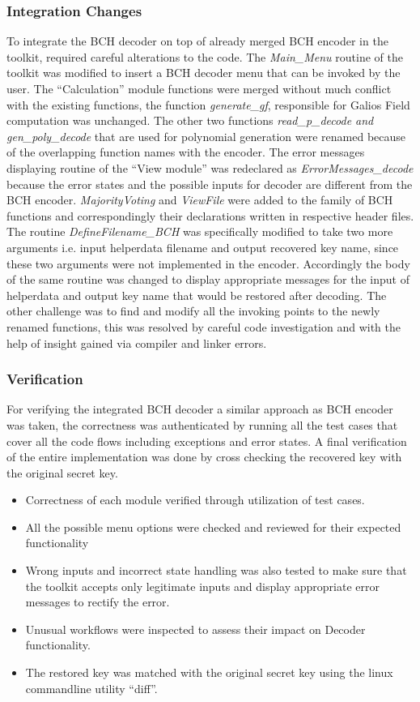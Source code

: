 \subsubsection{Integration Changes}
To integrate the BCH decoder on top of already merged BCH encoder in the toolkit, required careful alterations to the code. The \emph{Main\_Menu} routine of the toolkit was modified to insert a BCH decoder menu that can be invoked by the user. The ``Calculation'' module functions were merged without much conflict with the existing functions, the function \emph{generate\_gf}, responsible for Galios Field computation was unchanged. The other two functions
\emph{read\_p\_decode and gen\_poly\_decode} that are used for polynomial generation were renamed because of the overlapping function names with the encoder. The error messages displaying routine of the ``View module'' was redeclared as  \emph{ErrorMessages\_decode} because the error states and the possible inputs for decoder are different from the BCH encoder. \emph{MajorityVoting} and \emph{ViewFile} were added to the family of BCH functions and correspondingly their declarations written in respective header files. The
routine \emph{DefineFilename\_BCH} was specifically modified to take two more arguments i.e. input helperdata filename and output recovered key name, since these two arguments were not implemented in the encoder. Accordingly the body of the same routine was changed to display appropriate messages for the input of helperdata and output key name that would be restored after decoding. The other challenge was to find and modify all the invoking points to the newly renamed functions, this was
resolved by careful code investigation and with the help of insight gained via compiler and linker errors.\\

\subsubsection{Verification}
For verifying the integrated BCH decoder a similar approach as BCH encoder was taken, the correctness was authenticated by running all the test cases that cover all the code flows including exceptions and error states. A final verification of the entire implementation was done by cross checking the recovered key with the original secret key.


\begin{itemize}
	\item Correctness of each module verified through utilization of test cases.
	\item All the possible menu options were checked and reviewed for their expected functionality
	\item Wrong inputs and incorrect state handling was also tested to make sure that the toolkit accepts only legitimate inputs and display appropriate error messages to rectify the error.
	\item Unusual workflows were inspected to assess their impact on Decoder functionality.
	\item The restored key was matched with the original secret key using the linux commandline utility ``diff''.
\end{itemize}

